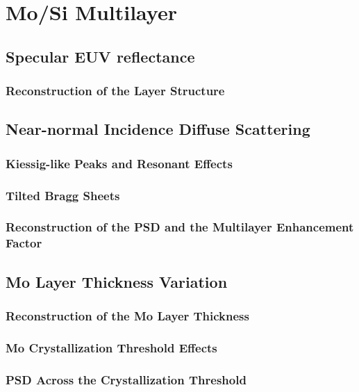 \chapter{Mo/Si Multilayer}
\cite{haase_role_2014}

\section{Specular EUV reflectance}

\subsection{Reconstruction of the Layer Structure}

\section{Near-normal Incidence Diffuse Scattering}

\subsection{Kiessig-like Peaks and Resonant Effects}

\subsection{Tilted Bragg Sheets}

\subsection{Reconstruction of the PSD and the Multilayer Enhancement Factor}

\section{Mo Layer Thickness Variation}

\subsection{Reconstruction of the Mo Layer Thickness}

\subsection{Mo Crystallization Threshold Effects}

\subsection{PSD Across the Crystallization Threshold}